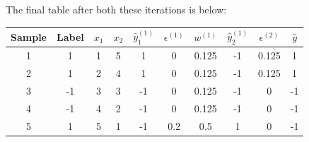\documentclass[11pt]{article}
\begin{document}
The final table after both these iterations is below:
\begin{table}[H]
      \centering
      \begin{tabular}{|c|c|c|c|c|c|c|c|c|c|}
            \hline
            \textbf{Sample} & \textbf{Label} & $x_1$ & $x_2$ & $\hat{y}_1^{(1)}$ & $\epsilon^{(1)}$ & $w^{(1)}$ & $\hat{y}_2^{(1)}$ & $\epsilon^{(2)}$ & $\hat{y}$ \\
            \hline
            1               & 1              & 1     & 5     & 1                 & 0                & 0.125     & -1                & 0.125            & 1         \\
            \hline
            2               & 1              & 2     & 4     & 1                 & 0                & 0.125     & -1                & 0.125            & 1         \\
            \hline
            3               & -1             & 3     & 3     & -1                & 0                & 0.125     & -1                & 0                & -1        \\
            \hline
            4               & -1             & 4     & 2     & -1                & 0                & 0.125     & -1                & 0                & -1        \\
            \hline
            5               & 1              & 5     & 1     & -1                & 0.2              & 0.5       & 1                 & 0                & -1        \\
            \hline
      \end{tabular}
\end{table}
\end{document}
